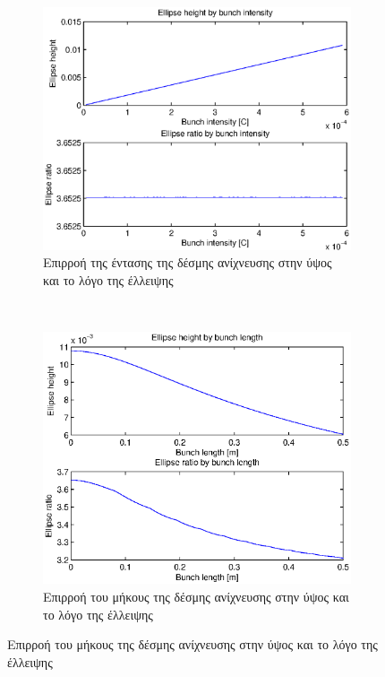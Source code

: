 \begin{figure}[tph]	
	\begin{subfigure}{0.45\textwidth}
		\includegraphics[width=0.9\linewidth]{figures/beam-deflection-script-03-elipse-height}
		\centering
		\caption{Επιρροή της έντασης της δέσμης ανίχνευσης στην ύψος και το λόγο της έλλειψης}
		\label{fig:beam-deflection-script-03-elipse-height}
	\end{subfigure}
	~
	\begin{subfigure}{0.45\textwidth}
		\includegraphics[width=0.9\linewidth]{figures/beam-deflection-script-04-elipse-height-by-bunch-intensity}
		\centering
		\caption{Επιρροή του μήκους της δέσμης ανίχνευσης στην ύψος και το λόγο της έλλειψης}
		\label{fig:beam-deflection-script-04-elipse-height-by-bunch-intensity}
	\end{subfigure}

\end{figure}
